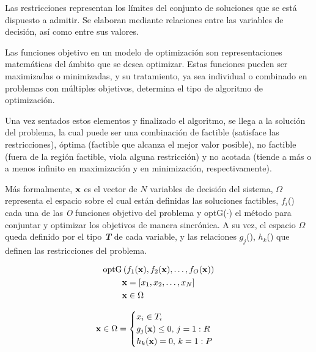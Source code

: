 Las restricciones representan los límites del conjunto de soluciones que se está dispuesto a admitir. Se elaboran mediante relaciones entre las variables de decisión, así como entre sus valores.

Las funciones objetivo en un modelo de optimización son representaciones matemáticas del ámbito que se desea optimizar. Estas funciones pueden ser maximizadas o minimizadas, y su tratamiento, ya sea individual o combinado en problemas con múltiples objetivos, determina el tipo de algoritmo de optimización.

Una vez sentados estos elementos y finalizado el algoritmo, se llega a la solución del problema, la cual puede ser una combinación de factible (satisface las restricciones), óptima (factible que alcanza el mejor valor posible), no factible (fuera de la región factible, viola alguna restricción) y no acotada (tiende a más o a menos infinito en maximización y en minimización, respectivamente).

Más formalmente, $\textbf{x}$ es el vector de $N$ variables de decisión del sistema, $\Omega$ representa el espacio sobre el cual están definidas las soluciones factibles, \textit{$f_i$}(\vFact) cada una de las \textit{O} funciones objetivo del problema y optG($\cdot$) el método para conjuntar y optimizar los objetivos de manera sincrónica.
A su vez, el espacio $\Omega$ queda definido por el tipo \textit{\textbf{T}} de cada variable, y las relaciones $g_j$(\vFact), $h_k$(\vFact) que definen las restricciones del problema.

\begin{figure}[h]
    \begin{minipage}[c]{0.45\linewidth}
        \vspace{0.2em} %
        \begin{equation*}
            \begin{aligned}
                \text{optG}&\left(f_1(\textbf{x}), f_2(\textbf{x}), \dots, f_O(\textbf{x})\right) \\
                &\textbf{x} = [x_1, x_2, \dots, x_N] \\
                &\textbf{x} \in \Omega
            \end{aligned}
        \end{equation*}
    \end{minipage}
    \hfill
    \begin{minipage}[c]{0.45\linewidth}
        \begin{equation*}
            \textbf{x} \in \Omega =
            \begin{cases}
                x_i \in T_i \\
                g_j(\textbf{x}) \leq 0, \, j=1:R \\
                h_k(\textbf{x}) = 0, \, k=1:P
            \end{cases}
        \end{equation*}
    \end{minipage}
\end{figure}

